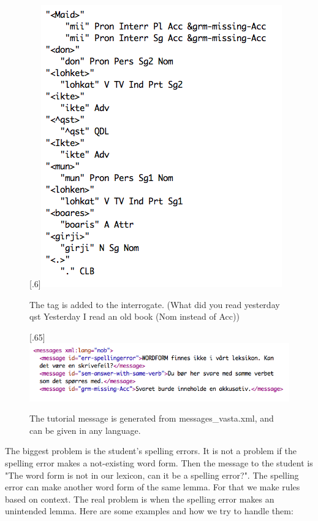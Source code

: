 \documentclass[a4paper,12pt]{article}
\begin{document}
\begin{figure}[htbp]
\begin{center}
\scalebox{.6}[.6]{\includegraphics{img/maid_lohket_ikte.png}}
\caption{The tag is added to the interrogate. (What did you read yesterday qst Yesterday I read an old book (Nom instead of Acc))}
\label{maidlohket}
\end{center}
\end{figure}



\begin{figure}[htbp]
\begin{center}
\scalebox{.65}[.65]{\includegraphics{img/messages_vasta.png}}
\caption{The tutorial message is generated from messages\_vasta.xml, and can be given in any language.}
\label{messv}
\end{center}
\end{figure}


The biggest problem is the student's spelling errors. It is not a problem if the spelling error makes a not-existing word form. Then the message to the student is  "The word form is not in our lexicon, can it be a spelling error?". The spelling error can make another word form of the same lemma. For that we make rules based on context. The real problem is when the spelling error makes an unintended lemma. Here are some examples and how we try to handle them:\\
\end{document}
